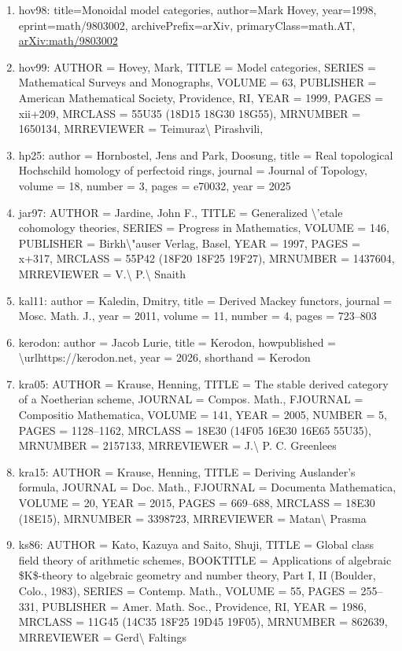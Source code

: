 \documentclass[11pt]{article}
\begin{document}
\begin{enumerate}[leftmargin=*]
  \item hov98: title=Monoidal model categories, author=Mark Hovey, year=1998, eprint=math/9803002, archivePrefix=arXiv, primaryClass=math.AT, \href{https://arxiv.org/abs/math/9803002}{arXiv:math/9803002}
  \item hov99: AUTHOR = Hovey, Mark, TITLE = Model categories, SERIES = Mathematical Surveys and Monographs, VOLUME = 63, PUBLISHER = American Mathematical Society, Providence, RI, YEAR = 1999, PAGES = xii+209, MRCLASS = 55U35 (18D15 18G30 18G55), MRNUMBER = 1650134, MRREVIEWER = Teimuraz\textbackslash{} Pirashvili,
  \item hp25: author = Hornbostel, Jens and Park, Doosung, title = Real topological Hochschild homology of perfectoid rings, journal = Journal of Topology, volume = 18, number = 3, pages = e70032, year = 2025
  \item jar97: AUTHOR = Jardine, John F., TITLE = Generalized \textbackslash{}'etale cohomology theories, SERIES = Progress in Mathematics, VOLUME = 146, PUBLISHER = Birkh\textbackslash{}"auser Verlag, Basel, YEAR = 1997, PAGES = x+317, MRCLASS = 55P42 (18F20 18F25 19F27), MRNUMBER = 1437604, MRREVIEWER = V.\textbackslash{} P.\textbackslash{} Snaith
  \item kal11: author = Kaledin, Dmitry, title = Derived Mackey functors, journal = Mosc. Math. J., year = 2011, volume = 11, number = 4, pages = 723--803
  \item kerodon: author = Jacob Lurie, title = Kerodon, howpublished = \textbackslash{}urlhttps://kerodon.net, year = 2026, shorthand = Kerodon
  \item kra05: AUTHOR = Krause, Henning, TITLE = The stable derived category of a Noetherian scheme, JOURNAL = Compos. Math., FJOURNAL = Compositio Mathematica, VOLUME = 141, YEAR = 2005, NUMBER = 5, PAGES = 1128--1162, MRCLASS = 18E30 (14F05 16E30 16E65 55U35), MRNUMBER = 2157133, MRREVIEWER = J.\textbackslash{} P. C. Greenlees
  \item kra15: AUTHOR = Krause, Henning, TITLE = Deriving Auslander's formula, JOURNAL = Doc. Math., FJOURNAL = Documenta Mathematica, VOLUME = 20, YEAR = 2015, PAGES = 669--688, MRCLASS = 18E30 (18E15), MRNUMBER = 3398723, MRREVIEWER = Matan\textbackslash{} Prasma
  \item ks86: AUTHOR = Kato, Kazuya and Saito, Shuji, TITLE = Global class field theory of arithmetic schemes, BOOKTITLE = Applications of algebraic \$K\$-theory to algebraic geometry and number theory, Part I, II (Boulder, Colo., 1983), SERIES = Contemp. Math., VOLUME = 55, PAGES = 255--331, PUBLISHER = Amer. Math. Soc., Providence, RI, YEAR = 1986, MRCLASS = 11G45 (14C35 18F25 19D45 19F05), MRNUMBER = 862639, MRREVIEWER = Gerd\textbackslash{} Faltings

\end{enumerate}
\end{document}
